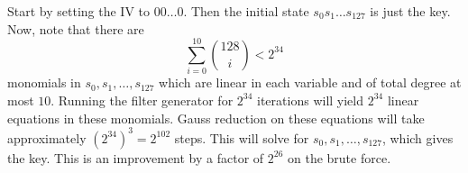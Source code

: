 Start by setting the IV to $00\dots 0$. Then the initial state $s_0s_1\dots s_{127}$
is just the key. Now, note that there are 
\[ \sum_{i=0}^{10} {128 \choose i} <2^{34}\] monomials in $s_0,s_1, \dots, s_{127}$
which are linear in each variable and of total degree at most $10$. Running
the filter generator for $2^{34}$ iterations will yield $2^{34}$ linear equations
in these monomials. Gauss reduction on these equations will take approximately
$(2^{34})^3 = 2^{102}$ steps. This will solve for $s_0,s_1,\dots, s_{127}$, which
gives the key. This is an improvement by a factor of $2^{26}$ on the brute force.
